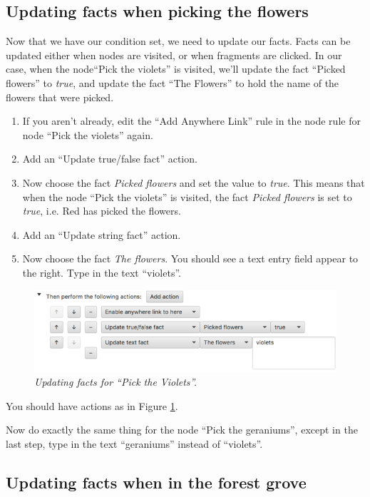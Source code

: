 \documentclass{article}
\begin{document}
\subsection{Updating facts when picking the flowers}

Now that we have our condition set, we need to update our facts. Facts can be updated either when nodes are visited, or when fragments are clicked. In our case, when the node``Pick the violets'' is visited, we'll update the fact ``Picked flowers'' to \textit{true}, and update the fact ``The Flowers'' to hold the name of the flowers that were picked.

\begin{enumerate}
  \item If you aren't already, edit the ``Add Anywhere Link'' rule in the
  node rule for node ``Pick the violets'' again.
  \item Add an ``Update true/false fact'' action.
  \item Now choose the fact \textit{Picked flowers} and set the value to
  \textit{true}. This means that when the node ``Pick the violets'' is visited, the fact \textit{Picked flowers} is set to \textit{true}, i.e. Red has picked the flowers.
  \item Add an ``Update string fact'' action.
  \item Now choose the fact \textit{The flowers}. You should see a text entry field appear to the right. Type in the text ``violets''.
\end{enumerate}

\begin{figure}[h]
  \centering
  \includegraphics[width=12cm]{images/hypedyn-tutorial-3-figure-11}
  \caption{\textit{Updating facts for ``Pick the Violets''.}}
  \label{fig:tut3:picktheviolets2}
\end{figure}

You should have actions as in Figure \ref{fig:tut3:picktheviolets2}.

Now do exactly the same thing for the node ``Pick the geraniums'', except in the last step, type in the text ``geraniums'' instead of ``violets''.

\subsection{Updating facts when in the forest grove}
\end{document}
